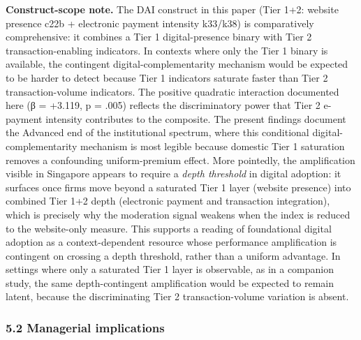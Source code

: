 \documentclass[12pt,a4paper]{article}
\begin{document}
\textbf{Construct-scope note.} The DAI construct in this paper (Tier
1+2: website presence c22b + electronic payment intensity k33/k38) is
comparatively comprehensive: it combines a Tier 1 digital-presence
binary with Tier 2 transaction-enabling indicators. In contexts where
only the Tier 1 binary is available, the contingent
digital-complementarity mechanism would be expected to be harder to
detect because Tier 1 indicators saturate faster than Tier 2
transaction-volume indicators. The positive quadratic interaction
documented here (β = +3.119, p = .005) reflects the discriminatory power
that Tier 2 e-payment intensity contributes to the composite. The
present findings document the Advanced end of the institutional
spectrum, where this conditional digital-complementarity mechanism is
most legible because domestic Tier 1 saturation removes a confounding
uniform-premium effect. More pointedly, the amplification visible in
Singapore appears to require a \emph{depth threshold} in digital
adoption: it surfaces once firms move beyond a saturated Tier 1 layer
(website presence) into combined Tier 1+2 depth (electronic payment and
transaction integration), which is precisely why the moderation signal
weakens when the index is reduced to the website-only measure. This
supports a reading of foundational digital adoption as a
context-dependent resource whose performance amplification is contingent
on crossing a depth threshold, rather than a uniform advantage. In
settings where only a saturated Tier 1 layer is observable, as in a
companion study, the same depth-contingent amplification would be
expected to remain latent, because the discriminating Tier 2
transaction-volume variation is absent.

\hypertarget{52-managerial-implications}{%
\subsubsection{5.2 Managerial
implications}\label{52-managerial-implications}}
\end{document}
